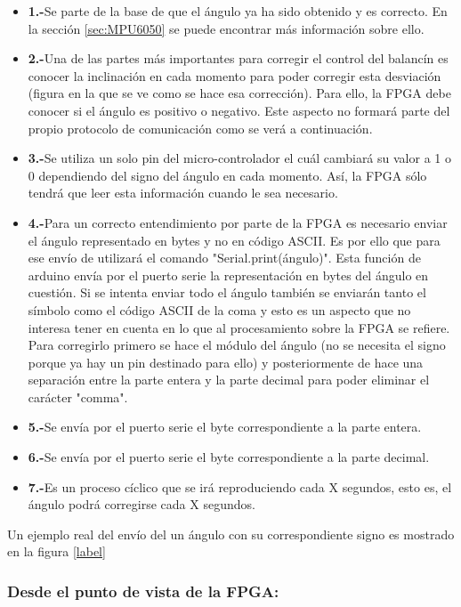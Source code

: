 \begin{itemize}
	\item \textbf{1.-}Se parte de la base de que el ángulo ya ha sido obtenido y es correcto. En la sección \ref{sec:MPU6050} se puede encontrar más información sobre ello.
	\item \textbf{2.-}Una de las partes más importantes para corregir el control del balancín es conocer la inclinación en cada momento para poder corregir esta desviación (figura en la que se ve como se hace esa corrección). Para ello, la FPGA debe conocer si el ángulo es positivo o negativo. Este aspecto no formará parte del propio protocolo de comunicación como se verá a continuación.
	\item \textbf{3.-}Se utiliza un solo pin del micro-controlador el cuál cambiará su valor a 1 o 0 dependiendo del signo del ángulo en cada momento. Así, la FPGA sólo tendrá que leer esta información cuando le sea necesario.
	\item \textbf{4.-}Para un correcto entendimiento por parte de la FPGA es necesario enviar el ángulo representado en bytes y no en código ASCII. Es por ello que para ese envío de utilizará el comando "Serial.print(ángulo)". Esta función de arduino envía por el puerto serie la representación en bytes del ángulo en cuestión.\newline
	Si se intenta enviar todo el ángulo también se enviarán tanto el símbolo como el código ASCII de la coma y esto es un aspecto que no interesa tener en cuenta en lo que al procesamiento sobre la FPGA se refiere. Para corregirlo primero se hace el módulo del ángulo (no se necesita el signo porque ya hay un pin destinado para ello) y posteriormente de hace una separación entre la parte entera y la parte decimal para poder eliminar el carácter "comma". 
	
	\item \textbf{5.-}Se envía por el puerto serie el byte correspondiente a la parte entera. 
	\item \textbf{6.-}Se envía por el puerto serie el byte correspondiente a la parte decimal. 
	\item \textbf{7.-}Es un proceso cíclico que se irá reproduciendo cada X segundos, esto es, el ángulo podrá corregirse cada X segundos. 
\end{itemize}
Un ejemplo real del envío del un ángulo con su correspondiente signo es mostrado en la figura \ref{label}

\subsubsection{Desde el punto de vista de la FPGA:} \newline

